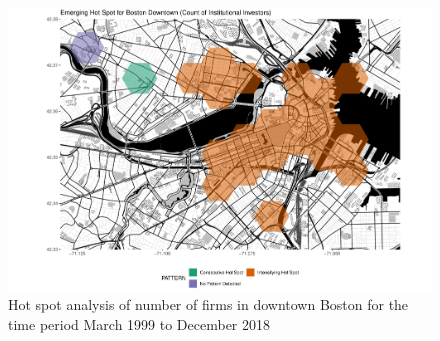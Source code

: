 \begin{figure}
	\centering
	\includegraphics[width=1\linewidth]{Figures/ChapterIV/Bos_Count_EH_Downtown}
	\caption[Hot Spot Analysis of Number of Firms in Downtown Boston 1999-2018]{Hot spot analysis of number of firms in downtown Boston for the time period March 1999 to December 2018}
	\label{fig:bostoncounthotspot_Downtown}
\end{figure}

